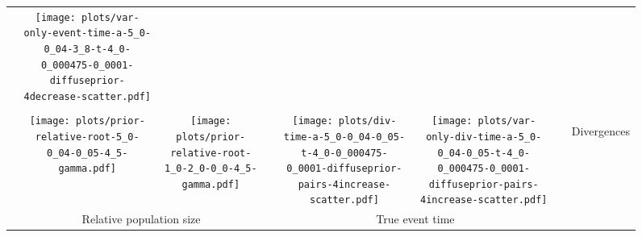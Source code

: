 \documentclass[border=10pt,varwidth=30cm]{standalone}
\begin{document}
\begin{figure}
\begin{tabular}{@{}cccccccc@{}}
        & \texttt{[image: plots/var-only-event-time-a-5\_0-0\_04-3\_8-t-4\_0-0\_000475-0\_0001-diffuseprior-4decrease-scatter.pdf]}
        & \multicolumn{1}{c|}{}
        & \\
        & & & & & & & \\
        & \texttt{[image: plots/prior-relative-root-5\_0-0\_04-0\_05-4\_5-gamma.pdf]}
        & \texttt{[image: plots/prior-relative-root-1\_0-2\_0-0\_0-4\_5-gamma.pdf]}
        &
        & \texttt{[image: plots/div-time-a-5\_0-0\_04-0\_05-t-4\_0-0\_000475-0\_0001-diffuseprior-pairs-4increase-scatter.pdf]}
        & \texttt{[image: plots/var-only-div-time-a-5\_0-0\_04-0\_05-t-4\_0-0\_000475-0\_0001-diffuseprior-pairs-4increase-scatter.pdf]}
        & \multicolumn{1}{c|}{}
        & \multirow{5}{*}[7.5em]{\begin{sideways}\Large Divergences\end{sideways}} \\
        & \multicolumn{2}{c}{\large Relative population size}
        &
        & \multicolumn{2}{c}{\large True event time}
        &
        & \\
    \end{tabular}
\end{figure}
\end{document}

